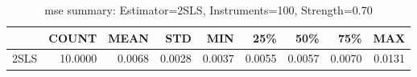 \begin{table}[ht]
\centering
\caption{mse summary: Estimator=2SLS, Instruments=100, Strength=0.70}
\begin{tabular}{lrrrrrrrr}
\toprule
 & COUNT & MEAN & STD & MIN & 25\% & 50\% & 75\% & MAX \\
\midrule
2SLS & 10.0000 & 0.0068 & 0.0028 & 0.0037 & 0.0055 & 0.0057 & 0.0070 & 0.0131 \\
\bottomrule
\end{tabular}
\end{table}
